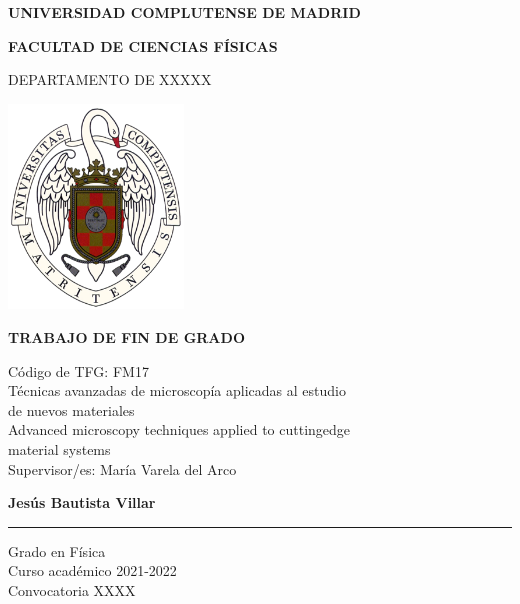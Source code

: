 
\begin{titlepage}
\centering
{ \bfseries \Large UNIVERSIDAD COMPLUTENSE DE MADRID}
\vspace{0.5cm}

{\bfseries  \Large FACULTAD DE CIENCIAS FÍSICAS} 
\vspace{1cm}

{\large DEPARTAMENTO DE XXXXX}
\vspace{0.8cm}

{\includegraphics[width=0.35\textwidth]{fig/logo_UCM.png}}
\vspace{0.8cm}

{\bfseries \Large TRABAJO DE FIN DE GRADO}

\vfill
{\Large Código de TFG:  FM17 } \vspace{5mm} \\
{\Large Técnicas avanzadas de microscopía aplicadas al estudio \\ de nuevos materiales}\vspace{5mm} \\
{\Large Advanced microscopy techniques applied to cuttingedge \\ material systems}\vspace{5mm} \\
{\Large Supervisor/es: María Varela del Arco}\\ 
\vfill

{\bfseries \LARGE Jesús Bautista Villar} \\
\noindent\rule{8cm}{0.4pt}\vspace{5mm}

{\large Grado en Física}\vspace{2.5mm} \\
{\large Curso acad\'emico 2021-2022}\vspace{2.5mm} \\
{\large Convocatoria XXXX} \\ 

\end{titlepage}

